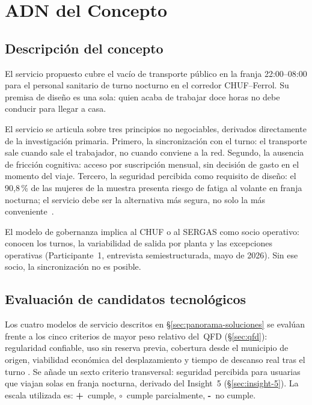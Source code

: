 \section{ADN del Concepto}\label{cap:adn-concepto}

\subsection{Descripción del concepto}
\label{sec:descripcion-concepto}

El servicio propuesto cubre el vacío de transporte público en la
franja 22:00--08:00 para el personal sanitario de turno nocturno
en el corredor \acs{CHUF}--Ferrol. Su premisa de diseño es una
sola: quien acaba de trabajar doce horas no debe conducir para
llegar a casa.

El servicio se articula sobre tres principios no negociables,
derivados directamente de la investigación primaria. Primero,
la sincronización con el turno: el transporte sale cuando sale
el trabajador, no cuando conviene a la red. Segundo, la ausencia
de fricción cognitiva: acceso por suscripción mensual, sin
decisión de gasto en el momento del viaje. Tercero, la seguridad
percibida como requisito de diseño: el 90,8\,\% de las mujeres
de la muestra presenta riesgo de fatiga al volante en franja
nocturna; el servicio debe ser la alternativa más segura, no solo
la más conveniente~\parencite{LouridoRegueira2026}.

El modelo de gobernanza implica al \acs{CHUF} o al \acs{SERGAS}
como socio operativo: conocen los turnos, la variabilidad de
salida por planta y las excepciones operativas
(Participante~1, entrevista semiestructurada, mayo de 2026).
Sin ese socio, la sincronización no es posible.

\subsection{Evaluación de candidatos tecnológicos}
\label{sec:evaluacion-candidatos}

Los cuatro modelos de servicio descritos en
§\ref{sec:panorama-soluciones} se evalúan frente a los cinco
criterios de mayor peso relativo del~\acs{QFD}
(§\ref{sec:qfd}): regularidad confiable, uso sin reserva previa,
cobertura desde el municipio de origen, viabilidad económica del
desplazamiento y tiempo de descanso real tras el turno
\parencite{LouridoRegueira2026}. Se añade un sexto criterio
transversal: seguridad percibida para usuarias que viajan solas
en franja nocturna, derivado del Insight~5
(§\ref{sec:insight-5}). La escala utilizada es: \textbf{+}~cumple,
\textbf{$\circ$}~cumple parcialmente, \textbf{-}~no cumple.


